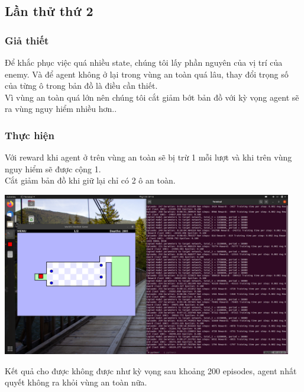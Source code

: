\documentclass[12pt,a4paper]{article}
\begin{document}
\subsection{Lần thử thứ 2}
\subsubsection{Giả thiết}
Để khắc phục việc quá nhiều state, chúng tôi lấy phần nguyên của vị trí của enemy. Và để agent không ở lại trong vùng an toàn quá lâu, thay đổi trọng số của từng ô trong bản đồ là điều cần thiết.\\
Vì vùng an toàn quá lớn nên chúng tôi cắt giảm bớt bản đồ với kỳ vọng agent sẽ ra vùng nguy hiểm nhiều hơn..
\subsubsection{Thực hiện}
Với reward khi agent ở trên vùng an toàn sẽ bị trừ 1 mỗi lượt và khi trên vùng nguy hiểm sẽ được cộng 1.\\
Cắt giảm bản đồ khi giữ lại chỉ có 2 ô an toàn.\\
\begin{center}
\includegraphics[width=0.95\textwidth]{Thesis_image/try2.png}\\    
\end{center}
Kết quả cho được không được như kỳ vọng sau khoảng 200 episodes, agent nhất quyết không ra khỏi vùng an toàn nữa.
\end{document}
